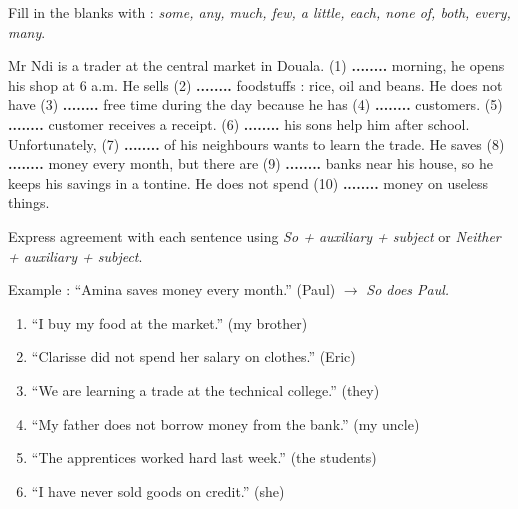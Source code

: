 \documentclass[11pt]{article}
\newcounter{popsec}
\newcounter{popsub}
\newcommand{\courssub}[1]{%
  \stepcounter{popsub}%
  \par\vspace{9pt}\noindent{\popxbold\fontsize{11.5}{13}\selectfont\color{popink}{\color{poporange}\thepopsec.\thepopsub}\hspace{6pt}#1}\par\nopagebreak\vspace{4pt}
}
\begin{document}
\begin{exercice}
Fill in the blanks with : \emph{some, any, much, few, a little, each, none of, both, every, many}.

Mr Ndi is a trader at the central market in Douala. (1) \textbf{........} morning, he opens his shop at 6 a.m. He sells (2) \textbf{........} foodstuffs : rice, oil and beans. He does not have (3) \textbf{........} free time during the day because he has (4) \textbf{........} customers. (5) \textbf{........} customer receives a receipt. (6) \textbf{........} his sons help him after school. Unfortunately, (7) \textbf{........} of his neighbours wants to learn the trade. He saves (8) \textbf{........} money every month, but there are (9) \textbf{........} banks near his house, so he keeps his savings in a tontine. He does not spend (10) \textbf{........} money on useless things.
\end{exercice}

\begin{exercice}
Express agreement with each sentence using \emph{So + auxiliary + subject} or \emph{Neither + auxiliary + subject}.

Example : ``Amina saves money every month.'' (Paul) $\rightarrow$ \emph{So does Paul.}

\begin{enumerate}
\item ``I buy my food at the market.'' (my brother)
\item ``Clarisse did not spend her salary on clothes.'' (Eric)
\item ``We are learning a trade at the technical college.'' (they)
\item ``My father does not borrow money from the bank.'' (my uncle)
\item ``The apprentices worked hard last week.'' (the students)
\item ``I have never sold goods on credit.'' (she)
\end{enumerate}
\end{exercice}

\courssub{Je me prépare au Bac}
\end{document}
